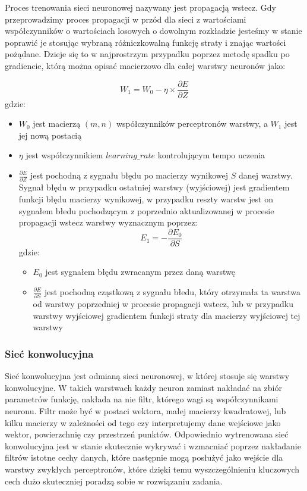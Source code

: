 \documentclass{article}
\begin{document}
Proces trenowania sieci neuronowej nazywany jest propagacją wstecz. Gdy 
przeprowadzimy proces propagacji w przód dla sieci z wartościami współczynników
o wartościach losowych o dowolnym rozkładzie jesteśmy w stanie poprawić 
je stosując wybraną różniczkowalną funkcję straty i znając wartości pożądane. Dzieje się to 
w najprostrzym przypadku poprzez metodę spadku po gradiencie, którą można 
opisać macierzowo dla całej warstwy neuronów jako:

\begin{equation}
    W_1 = W_0 - \eta \times \frac{\partial E}{\partial Z}
\end{equation}
gdzie:
\begin{itemize}
    \item $W_0$ jest macierzą $(m, n)$ współczynników perceptronów warstwy, a $W_1$ jest jej nową postacią
    \item $\eta$ jest współczynnikiem $learning\_rate$ kontrolującym tempo uczenia
    \item $\frac{\partial E}{\partial Z}$ jest pochodną z sygnału błędu po 
    macierzy wynikowej $S$ danej warstwy. Sygnał błędu w przypadku ostatniej warstwy (wyjściowej) jest
    gradientem funkcji błędu macierzy wynikowej, w przypadku reszty warstw 
    jest on sygnałem błedu pochodzącym z poprzednio aktualizowanej w procesie propagacji wstecz warstwy
    wyznacznym poprzez:
    \begin{equation}
        E_1 = -\frac{\partial E_0}{\partial S}
    \end{equation}
    gdzie:
    \begin{itemize}
        \item $E_0$ jest sygnałem błędu zwracanym przez daną warstwę
        \item $\frac{\partial E}{\partial S}$ jest pochodną cząstkową z sygnału błedu, 
        który otrzymała ta warstwa od warstwy poprzedniej w procesie propagacji wstecz, lub w przypadku warstwy
        wyjściowej gradientem funkcji straty dla macierzy wyjściowej tej warstwy
    \end{itemize}
\end{itemize}

\subsubsection{Sieć konwolucyjna}
Sieć konwolucyjna jest odmianą sieci neuronowej, 
w której stosuje się warstwy konwolucyjne. W takich 
warstwach każdy neuron zamiast nakładać na zbiór parametrów 
funkcję, nakłada na nie filtr, którego wagi są współczynnikami 
neuronu. Filtr może być w postaci wektora, małej macierzy kwadratowej, 
lub kilku macierzy w zależności od tego czy interpretujemy dane wejściowe 
jako wektor, powierzchnię czy przestrzeń punktów. Odpowiednio wytrenowana 
sieć konwolucyjna jest w stanie skutecznie wykrywać i wzmacniać poprzez 
nakładanie filtrów istotne cechy danych, które następnie mogą posłużyć 
jako wejście dla warstwy zwykłych perceptronów, które dzięki temu wyszczególnieniu 
kluczowych cech dużo skuteczniej poradzą sobie w rozwiązaniu zadania.
\end{document}
